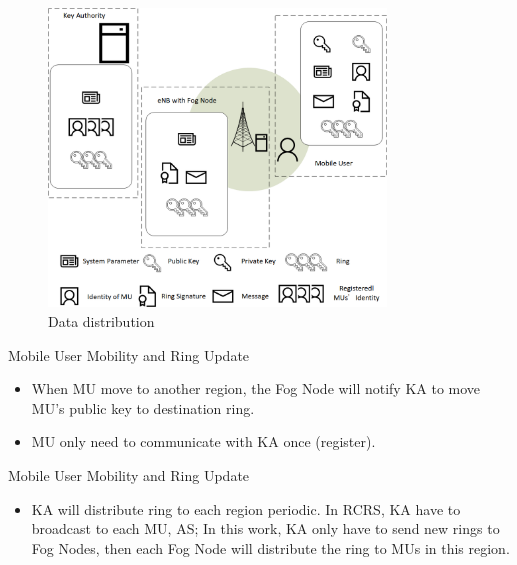 \documentclass{beamer}
\begin{document}
\begin{frame}{}
    \begin{figure}[t]
        \centering
        \includegraphics[width=0.8\textwidth]{figures/5.png}
        \caption{Data distribution}
    \end{figure}
\end{frame}
\begin{frame}{Mobile User Mobility and Ring Update}
    \begin{itemize}
        \item {When MU move to another region, the Fog Node will notify KA to move MU's public key to destination ring.}
        \item {MU only need to communicate with KA once (register).}
    \end{itemize}
\end{frame}
\begin{frame}{Mobile User Mobility and Ring Update}
    \begin{itemize}
        
        \item {KA will distribute ring to each region periodic. In RCRS, KA have to broadcast to each MU, AS; In this work, KA only have to send new rings to Fog Nodes, then each Fog Node will distribute the ring to MUs in this region.}
    \end{itemize}
\end{frame} 
\end{document}
